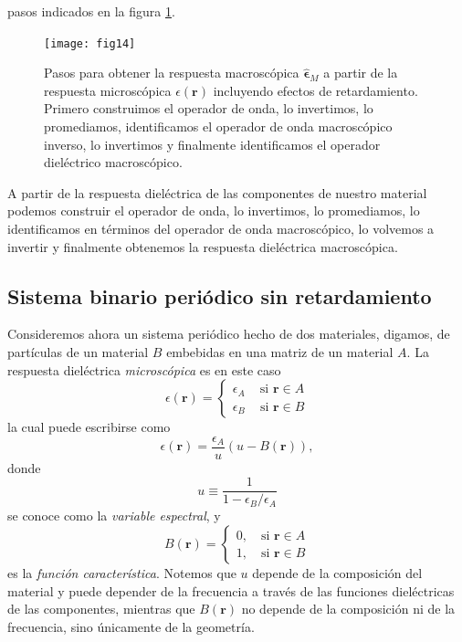 \documentclass[12pt]{article}
\begin{document}
pasos indicados en la figura \ref{fig:circulo}.
\begin{figure}
  \centering
  \texttt{[image: fig14]}
  \caption{Pasos para obtener la respuesta macroscópica
    $\hat{\bm \epsilon}_M$ a partir de la respuesta microscópica
    $\epsilon(\bm r)$ incluyendo efectos de retardamiento. Primero
    construimos el operador de onda, lo
    invertimos, lo promediamos, identificamos el operador de onda
    macroscópico inverso, lo invertimos y finalmente identificamos el
    operador dieléctrico macroscópico.}
  \label{fig:circulo}
\end{figure}
A partir de la respuesta dieléctrica de las componentes de nuestro
material podemos construir el operador de onda, lo invertimos, lo
promediamos, lo identificamos en términos del operador de onda
macroscópico, lo volvemos a invertir y finalmente obtenemos la
respuesta dieléctrica  macroscópica.\cite{samuel}

\subsection{Sistema binario periódico sin retardamiento}
\label{binario}
Consideremos ahora un sistema periódico hecho de dos materiales,
digamos, de partículas de un material $B$ embebidas en una matriz de
un material $A$. La respuesta dieléctrica {\em microscópica} es en
este caso
\begin{equation}
  \label{eq:epsmic}
  \epsilon(\bm r)=\left\{
      \begin{matrix}
        \epsilon_A\,\quad\text{si $\bm r\in A$}\\
        \epsilon_B\,\quad\text{si $\bm r\in B$}
      \end{matrix}
    \right.
\end{equation}
la cual puede escribirse como
\begin{equation}
  \label{eq:epsmic1}
  \epsilon(\bm r)=\frac{\epsilon_A}{u}(u-B(\bm r)),
\end{equation}
donde
\begin{equation}
  \label{eq:u}
  u\equiv\frac{1}{1-\epsilon_B/\epsilon_A}
\end{equation}
se conoce como la {\em variable espectral}, y
\begin{equation}
  \label{eq:B}
  B(\bm r)=\left\{
      \begin{matrix}
        0,\quad\text{si $\bm r\in A$}\\
        1,\quad\text{si $\bm r\in B$}
      \end{matrix}
    \right.
\end{equation}
es la {\em función característica}. Notemos que $u$ depende de la
composición del material y puede depender de la frecuencia a través de
las funciones dieléctricas de las componentes, mientras que $B(\bm r)$ no
depende de la composición ni de la frecuencia, sino únicamente de la
geometría.
\end{document}
